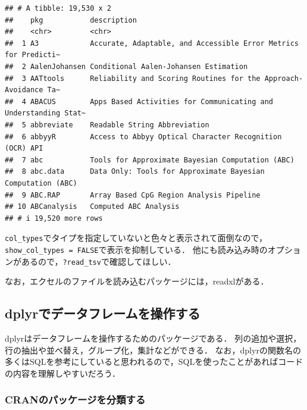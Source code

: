 \documentclass[
]{article}
\begin{document}
\begin{verbatim}
## # A tibble: 19,530 x 2
##    pkg           description                                                    
##    <chr>         <chr>                                                          
##  1 A3            Accurate, Adaptable, and Accessible Error Metrics for Predicti~
##  2 AalenJohansen Conditional Aalen-Johansen Estimation                          
##  3 AATtools      Reliability and Scoring Routines for the Approach-Avoidance Ta~
##  4 ABACUS        Apps Based Activities for Communicating and Understanding Stat~
##  5 abbreviate    Readable String Abbreviation                                   
##  6 abbyyR        Access to Abbyy Optical Character Recognition (OCR) API        
##  7 abc           Tools for Approximate Bayesian Computation (ABC)               
##  8 abc.data      Data Only: Tools for Approximate Bayesian Computation (ABC)    
##  9 ABC.RAP       Array Based CpG Region Analysis Pipeline                       
## 10 ABCanalysis   Computed ABC Analysis                                          
## # i 19,520 more rows
\end{verbatim}

\texttt{col\_types}でタイプを指定していないと色々と表示されて面倒なので，\texttt{show\_col\_types\ =\ FALSE}で表示を抑制している．
他にも読み込み時のオプションがあるので，\texttt{?read\_tsv}で確認してほしい．

なお，エクセルのファイルを読み込むパッケージには，readxlがある．

\hypertarget{dplyrux3067ux30c7ux30fcux30bfux30d5ux30ecux30fcux30e0ux3092ux64cdux4f5cux3059ux308b}{%
\subsection{dplyrでデータフレームを操作する}\label{dplyrux3067ux30c7ux30fcux30bfux30d5ux30ecux30fcux30e0ux3092ux64cdux4f5cux3059ux308b}}

dplyrはデータフレームを操作するためのパッケージである．
列の追加や選択，行の抽出や並べ替え，グループ化，集計などができる．
なお，dplyrの関数名の多くはSQLを参考にしていると思われるので，SQLを使ったことがあればコードの内容を理解しやすいだろう．

\hypertarget{cranux306eux30d1ux30c3ux30b1ux30fcux30b8ux3092ux5206ux985eux3059ux308b}{%
\subsubsection{CRANのパッケージを分類する}\label{cranux306eux30d1ux30c3ux30b1ux30fcux30b8ux3092ux5206ux985eux3059ux308b}}
\end{document}
